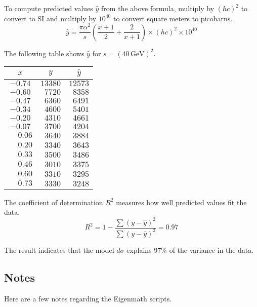 \documentclass[12pt]{article}
\begin{document}
To compute predicted values $\hat{y}$ from the above formula,
multiply by $(hc)^2$ to convert to SI
and multiply by $10^{40}$ to convert square meters to picobarns.
\begin{equation*}
\hat{y}
=
\frac{\pi\alpha^2}{s}
\left(
\frac{x+1}{2}+
\frac{2}{x+1}
\right)
\times(hc)^2
\times10^{40}
\end{equation*}

The following table shows $\hat{y}$
for $s=(40\,\text{GeV})^2$.

\begin{center}
\begin{tabular}{|c|c|c|}
\hline
$x$ & $y$ & $\hat{y}$\\
\hline
$-0.74$ & $13380$ & $12573$\\
$-0.60$ & $\phantom{0}7720$ & $\phantom{0}8358$\\
$-0.47$ & $\phantom{0}6360$ & $\phantom{0}6491$\\
$-0.34$ & $\phantom{0}4600$ & $\phantom{0}5401$\\
$-0.20$ & $\phantom{0}4310$ & $\phantom{0}4661$\\
$-0.07$ & $\phantom{0}3700$ & $\phantom{0}4204$\\
$\phantom{+}0.06$ & $\phantom{0}3640$ & $\phantom{0}3884$\\
$\phantom{+}0.20$ & $\phantom{0}3340$ & $\phantom{0}3643$\\
$\phantom{+}0.33$ & $\phantom{0}3500$ & $\phantom{0}3486$\\
$\phantom{+}0.46$ & $\phantom{0}3010$ & $\phantom{0}3375$\\
$\phantom{+}0.60$ & $\phantom{0}3310$ & $\phantom{0}3295$\\
$\phantom{+}0.73$ & $\phantom{0}3330$ & $\phantom{0}3248$\\
\hline
\end{tabular}
\end{center}

The coefficient of determination $R^2$ measures how well predicted values fit the data.
\begin{equation*}
R^2=1-\frac{\sum(y-\hat{y})^2}{\sum(y-\bar{y})^2}=0.97
\end{equation*}

The result indicates that the model $d\sigma$ explains 97\% of the variance in the data.

\fi

\subsection*{Notes}
Here are a few notes regarding the Eigenmath scripts.
\end{document}
